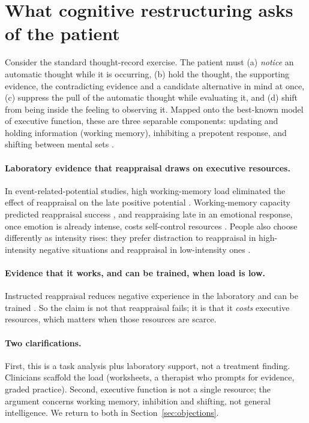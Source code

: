 \section{What cognitive restructuring asks of the patient}\label{sec:demands}
Consider the standard thought-record exercise. The patient must (a) \emph{notice} an automatic thought while it is occurring, (b) hold the thought, the supporting evidence, the contradicting evidence and a candidate alternative in mind at once, (c) suppress the pull of the automatic thought while evaluating it, and (d) shift from being inside the feeling to observing it. Mapped onto the best-known model of executive function, these are three separable components: updating and holding information (working memory), inhibiting a prepotent response, and shifting between mental sets \citep{miyake2000unity}.

\paragraph{Laboratory evidence that reappraisal draws on executive resources.} In event-related-potential studies, high working-memory load eliminated the effect of reappraisal on the late positive potential \citep{gan2017load,adamczyk2022load}. Working-memory capacity predicted reappraisal success \citep{schmeichel2008memory}, and reappraising late in an emotional response, once emotion is already intense, costs self-control resources \citep{sheppes2008costs}. People also choose differently as intensity rises: they prefer distraction to reappraisal in high-intensity negative situations and reappraisal in low-intensity ones \citep{sheppes2011choice}.

\paragraph{Evidence that it works, and can be trained, when load is low.} Instructed reappraisal reduces negative experience in the laboratory \citep{hofmann2009anxiety} and can be trained \citep{denny2014training}. So the claim is not that reappraisal fails; it is that it \emph{costs} executive resources, which matters when those resources are scarce.

\paragraph{Two clarifications.} First, this is a task analysis plus laboratory support, not a treatment finding. Clinicians scaffold the load (worksheets, a therapist who prompts for evidence, graded practice). Second, executive function is not a single resource; the argument concerns working memory, inhibition and shifting, not general intelligence. We return to both in Section~\ref{sec:objections}.
